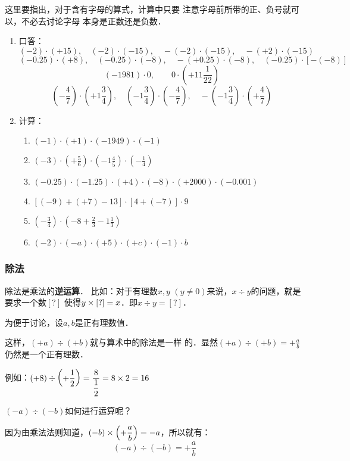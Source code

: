 这里要指出，对于含有字母的算式，计算中只要
注意字母前所带的正、负号就可以，不必去讨论字母
本身是正数还是负数．

\begin{ex}
	\begin{enumerate}
		\item 口答：
		\[(-2)\cdot (+15),\quad (-2)\cdot (-15),\quad -(-2)\cdot (-15),\quad -(+2)\cdot (-15)\]
		\[(-0.25)\cdot (+8),\quad (-0.25)\cdot (-8),\quad -(+0.25)\cdot (-8),\quad(-0.25)\cdot [-(-8)] \]
		\[(-1981)\cdot 0,\qquad 0\cdot\left(+11\frac{1}{22}\right)\]
		\[\left(-\frac{4}{7}\right)\cdot \left(+1\frac{3}{4}\right),\quad \left(-1\frac{3}{4}\right)\cdot\left(-\frac{4}{7}\right),\quad -\left(-1\frac{3}{4}\right)\cdot\left(+\frac{4}{7}\right)\]
		
		\item 计算：
		\begin{enumerate}
			\item $(-1)\cdot(+1)\cdot (-1949)\cdot (-1)$
			\item $(-3)\cdot \left(+\frac{5}{6}\right)\cdot \left(-1\frac{4}{5}\right)\cdot\left(-\frac{1}{4}\right)$
			\item $(-0.25)\cdot (-1.25)\cdot (+4)\cdot (-8)\cdot (+2000)\cdot (-0.001)$
			\item $[(-9)+(+7)-13]\cdot [4+(-7)]\cdot 9$
			\item $\left(-\frac{3}{4}\right)\cdot \left(-8+\frac{2}{3}-1\frac{1}{3}\right)$
			\item $(-2)\cdot (-a)\cdot (+5)\cdot (+c)\cdot (-1)\cdot b$
		\end{enumerate}
	\end{enumerate}    
\end{ex}

\subsubsection{除法}
除法是乘法的\textbf{逆运算}． 比如：对于有理数$x,  y$
$(y\ne 0)$来说，$x\div y$的问题，就是要求一个数$[?]$
使得$y\times[?]=x$．即$x\div y=[?]$．

为便于讨论，设$a,b$是正有理数值．

这样，$(+a) \div (+b)$就与算术中的除法是一样
的．显然$(+a)\div (+b)=+\frac{a}{b}$仍然是一个正有理数．

例如：$(+8)\div\left(+\dfrac{1}{2}\right)=\dfrac{8}{\dfrac{1}{2}}=8\times 2=16$

$(-a) \div (-b)$如何进行运算呢？

因为由乘法法则知道，$(-b)\times \left(+\dfrac{a}{b}\right)=-a$，所以就有：
\[(-a) \div (-b)=+\frac{a}{b}\]

